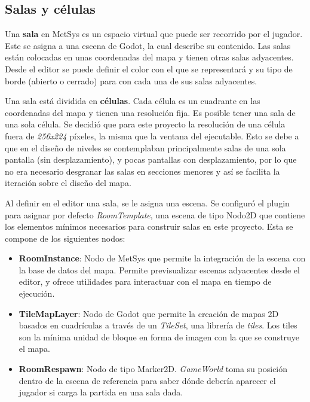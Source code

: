 \subsection{Salas y células}

Una \textbf{sala} en MetSys es un espacio virtual que puede ser recorrido por el jugador. Este se asigna a una escena de Godot, la cual describe su contenido. Las salas están colocadas en unas coordenadas del mapa y tienen otras salas adyacentes. Desde el editor se puede definir el color con el que se representará y su tipo de borde (abierto o cerrado) para con cada una de sus salas adyacentes.

Una sala está dividida en \textbf{células}. Cada célula es un cuadrante en las coordenadas del mapa y tienen una resolución fija. Es posible tener una sala de una sola célula. Se decidió que para este proyecto la resolución de una célula fuera de \textit{256x224} píxeles, la misma que la ventana del ejecutable. Esto se debe a que en el diseño de niveles se contemplaban principalmente salas de una sola pantalla (sin desplazamiento), y pocas pantallas con desplazamiento, por lo que no era necesario desgranar las salas en secciones menores y así se facilita la iteración sobre el diseño del mapa.


Al definir en el editor una sala, se le asigna una escena. Se configuró el plugin para asignar por defecto \textit{RoomTemplate}, una escena de tipo Nodo2D que contiene los elementos mínimos necesarios para construir salas en este proyecto. Esta se compone de los siguientes nodos:

\begin{itemize}
    \item \textbf{RoomInstance}: Nodo de MetSys que permite la integración de la escena con la base de datos del mapa. Permite previsualizar escenas adyacentes desde el editor, y ofrece utilidades para interactuar con el mapa en tiempo de ejecución.
    \item \textbf{TileMapLayer}: Nodo de Godot que permite la creación de mapas 2D basados en cuadrículas a través de un \textit{TileSet}, una librería de \textit{tiles}. Los tiles son la mínima unidad de bloque en forma de imagen con la que se construye el mapa.
    \item \textbf{RoomRespawn}: Nodo de tipo Marker2D. \textit{GameWorld} toma su posición dentro de la escena de referencia para saber dónde debería aparecer el jugador si carga la partida en una sala dada.
\end{itemize}

